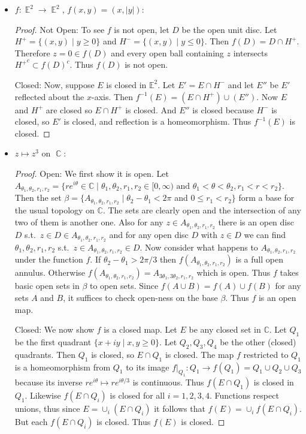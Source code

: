 \documentclass{book}
\DeclareMathOperator*{\C}{\mathbb{C}}
\DeclareMathOperator*{\E}{\mathbb{E}}
\begin{document}
\begin{enumerate}[(1)]
\begin{itemize}
            \item $f: \E^2 \rightarrow \E^2$, $f(x,y) = (x, |y|)$:  
                \begin{proof} Not Open: To see $f$ is not open, let $D$ be the open unit disc.  Let $H^+=\{(x,y)\mid y\geq 0\}$ and $H^-=\{(x,y)\mid y\leq 0\}$.  Then $f(D)=D\cap H^+$.  Therefore $z=0\in f(D)$ and every open ball containing $z$ intersects ${H^+}^c\subset f(D)^c$.  Thus $f(D)$ is not open.
                    \par Closed: Now, suppose $E$ is closed in $\mathbb E^2$.  Let $E'=E\cap H^-$ and let $E''$ be $E'$ reflected about the $x$-axis. Then $f^{-1}(E)= (E\cap H^+)\cup(E'')$.  Now $E$ and $H^+$ are closed so $E\cap H^+$ is closed.  And $E''$ is closed because $H^-$ is closed, so $E'$ is closed, and reflection is a homeomorphism.  Thus $f^{-1}(E)$ is closed.
                \end{proof}

            \item $z \mapsto z^3$ on $\C$: 
                \begin{proof} Open: We first show it is open.  Let $A_{\theta_1,\theta_2,r_1,r_2}=\{re^{i\theta}\in \mathbb C\mid \theta_1,\theta_2,r_1,r_2\in[0,\infty)\text{ and } \theta_1<\theta<\theta_2, r_1<r<r_2\}$.  Then the set $\beta=\{A_{\theta_1,\theta_2,r_1,r_2}\mid\theta_2-\theta_1<2\pi$ and $0\leq r_1<r_2\}$ form a base for the usual topology on $\mathbb C$.  The sets are clearly open and the intersection of any two of them is another one.  Also for any $z\in A_{\theta_1,\theta_2,r_1,r_2}$ there is an open disc $D$ s.t.\ $z\in D\in A_{\theta_1,\theta_2,r_1,r_2}$ and for any open disc $D$ with $z\in D$ we can find ${\theta_1,\theta_2,r_1,r_2}$ s.t.\ $z\in A_{\theta_1,\theta_2,r_1,r_2}\in D$.   Now consider what happens to $A_{\theta_1,\theta_2,r_1,r_2}$ under the function $f$.  If $\theta_2-\theta_1>2\pi/3$ then $f(A_{\theta_1,\theta_2,r_1,r_2})$ is a full open annulus.  Otherwise $f(A_{\theta_1,\theta_2,r_1,r_2})=A_{3\theta_1,3\theta_2,r_1,r_2}$ which is open.  Thus $f$ takes basic open sets in $\beta$ to open sets.  Since $f(A\cup B)=f(A)\cup f(B)$ for any sets $A$ and $B$, it suffices to check open-ness on the base $\beta$. Thus $f$ is an open map.
                    \par Closed: We now show $f$ is a closed map.  Let $E$ be any closed set in $\mathbb C$.  Let $Q_1$ be the first quadrant $\{x+iy\mid x,y\geq 0\}$.  Let $Q_2,Q_3,Q_4$ be the other (closed) quadrants.  Then $Q_1$ is closed, so $E\cap Q_1$ is closed.  The map $f$ restricted to $Q_1$ is a homeomorphism from $Q_1$ to its image $f|_{Q_1}:Q_1\rightarrow f(Q_1)=Q_1\cup Q_2\cup Q_3$ because its inverse $re^{i\theta}\mapsto re^{i\theta/3}$ is continuous.  Thus $f(E\cap Q_1)$ is closed in $Q_1$.  Likewise $f(E\cap Q_i)$ is closed for all $i=1,2,3,4$.  Functions respect unions, thus since $E=\cup_i(E\cap Q_i)$ it follows that $f(E)=\cup_i f(E\cap Q_i)$.  But each $f(E\cap Q_i)$ is closed.  Thus $f(E)$ is closed.
                \end{proof}
        \end{itemize}


\end{enumerate}
\end{document}
